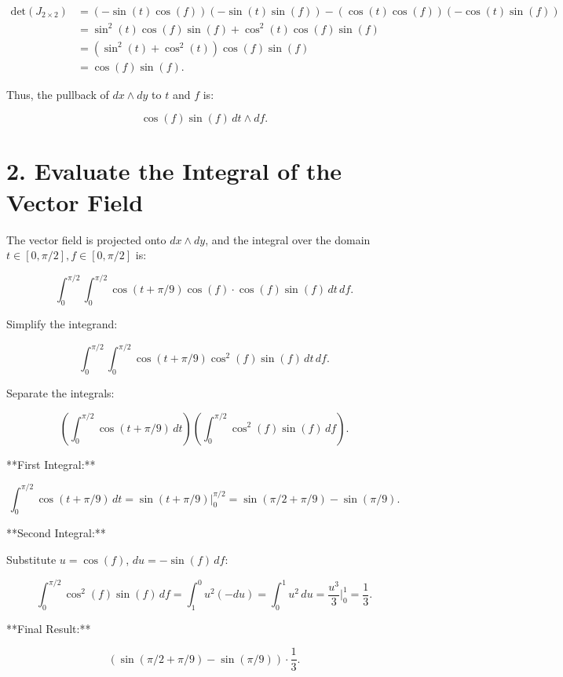 \documentclass{article}
\begin{document}
	\[
	\begin{aligned}
		\text{det}(J_{2\times2}) &= (-\sin(t)\cos(f))(-\sin(t)\sin(f)) - (\cos(t)\cos(f))(-\cos(t)\sin(f)) \\
		&= \sin^2(t)\cos(f)\sin(f) + \cos^2(t)\cos(f)\sin(f) \\
		&= (\sin^2(t) + \cos^2(t))\cos(f)\sin(f) \\
		&= \cos(f)\sin(f).
	\end{aligned}
	\]
	
	Thus, the pullback of \( dx \wedge dy \) to \( t \) and \( f \) is:
	
	\[
	\cos(f)\sin(f) \, dt \wedge df.
	\]
	
	\section*{2. Evaluate the Integral of the Vector Field}
	The vector field is projected onto \( dx \wedge dy \), and the integral over the domain \( t \in [0, \pi/2], f \in [0, \pi/2] \) is:
	
	\[
	\int_{0}^{\pi/2} \int_{0}^{\pi/2} \cos(t + \pi/9)\cos(f) \cdot \cos(f)\sin(f) \, dt \, df.
	\]
	
	Simplify the integrand:
	
	\[
	\int_{0}^{\pi/2} \int_{0}^{\pi/2} \cos(t + \pi/9) \cos^2(f)\sin(f) \, dt \, df.
	\]
	
	Separate the integrals:
	
	\[
	\left( \int_{0}^{\pi/2} \cos(t + \pi/9) \, dt \right) \left( \int_{0}^{\pi/2} \cos^2(f)\sin(f) \, df \right).
	\]
	
	**First Integral:**
	
	\[
	\int_{0}^{\pi/2} \cos(t + \pi/9) \, dt = \sin(t + \pi/9) \big|_{0}^{\pi/2} = \sin(\pi/2 + \pi/9) - \sin(\pi/9).
	\]
	
	**Second Integral:**
	
	Substitute \( u = \cos(f) \), \( du = -\sin(f) \, df \):
	
	\[
	\int_{0}^{\pi/2} \cos^2(f)\sin(f) \, df = \int_{1}^{0} u^2 (-du) = \int_{0}^{1} u^2 \, du = \frac{u^3}{3} \big|_{0}^{1} = \frac{1}{3}.
	\]
	
	**Final Result:**
	
	\[
	\left( \sin(\pi/2 + \pi/9) - \sin(\pi/9) \right) \cdot \frac{1}{3}.
	\]
	
\end{document}
